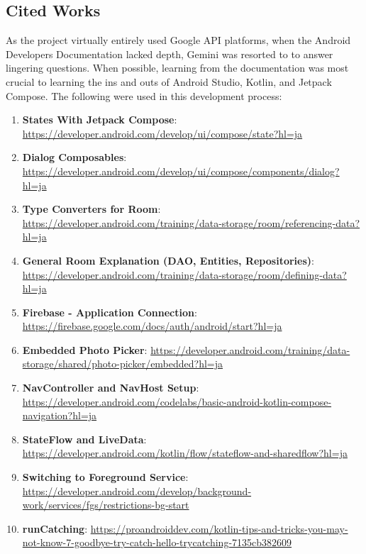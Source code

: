 \documentclass{article}
\begin{document}
                \subsection{Cited Works}

                    As the project virtually entirely used Google API platforms,
                    when the Android Developers Documentation lacked depth, Gemini was
                    resorted to to answer lingering questions. When possible, learning 
                    from the documentation was most crucial to learning the ins and outs
                    of Android Studio, Kotlin, and Jetpack Compose. The following were used 
                    in this development process:

                    \begin{enumerate}
                        \item \textbf{States With Jetpack Compose}: \url{https://developer.android.com/develop/ui/compose/state?hl=ja}
                        \item \textbf{Dialog Composables}: \url{https://developer.android.com/develop/ui/compose/components/dialog?hl=ja}
                        \item \textbf{Type Converters for Room}: \url{https://developer.android.com/training/data-storage/room/referencing-data?hl=ja}
                        \item \textbf{General Room Explanation (DAO, Entities, Repositories)}: \url{https://developer.android.com/training/data-storage/room/defining-data?hl=ja}
                        \item \textbf{Firebase - Application Connection}: \url{https://firebase.google.com/docs/auth/android/start?hl=ja}
                        \item \textbf{Embedded Photo Picker}: \url{https://developer.android.com/training/data-storage/shared/photo-picker/embedded?hl=ja}
                        \item \textbf{NavController and NavHost Setup}: \url{https://developer.android.com/codelabs/basic-android-kotlin-compose-navigation?hl=ja}
                        \item \textbf{StateFlow and LiveData}: \url{https://developer.android.com/kotlin/flow/stateflow-and-sharedflow?hl=ja}
                        \item \textbf{Switching to Foreground Service}: \url{https://developer.android.com/develop/background-work/services/fgs/restrictions-bg-start}
                        \item \textbf{runCatching}: \url{https://proandroiddev.com/kotlin-tips-and-tricks-you-may-not-know-7-goodbye-try-catch-hello-trycatching-7135cb382609}
                    \end{enumerate}
\end{document}

